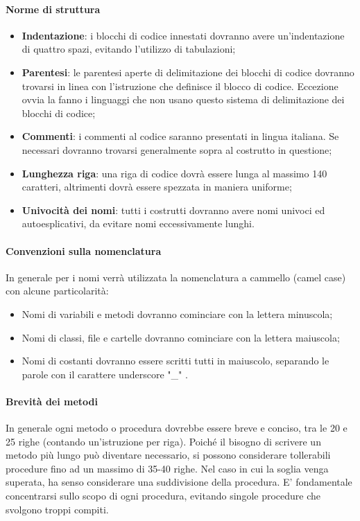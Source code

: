 \paragraph{Norme di struttura}
\begin{itemize}
\item \textbf{Indentazione}: i blocchi di codice innestati dovranno avere un’indentazione di quattro spazi, evitando l'utilizzo di tabulazioni;
\item \textbf{Parentesi}: le parentesi aperte di delimitazione dei blocchi di codice dovranno trovarsi in linea con l'istruzione che definisce il blocco di codice. Eccezione ovvia la fanno i linguaggi che non usano questo sistema di delimitazione dei blocchi di codice;
\item \textbf{Commenti}: i commenti al codice saranno presentati in lingua italiana. Se necessari dovranno trovarsi generalmente sopra al costrutto in questione;
\item \textbf{Lunghezza riga}: una riga di codice dovrà essere lunga al massimo 140 caratteri, altrimenti dovrà essere spezzata in maniera uniforme;
\item  \textbf{Univocità dei nomi}: tutti i costrutti dovranno avere nomi univoci ed autoesplicativi, da evitare nomi eccessivamente lunghi.
\end{itemize}

\paragraph{Convenzioni sulla nomenclatura}
In generale per i nomi verrà utilizzata la nomenclatura a cammello (camel case) con alcune particolarità:
\begin{itemize}
\item Nomi di variabili e metodi dovranno cominciare con la lettera minuscola;
\item Nomi di classi, file e cartelle dovranno cominciare con la lettera maiuscola;
\item Nomi di costanti dovranno essere scritti tutti in maiuscolo, separando le parole con il carattere underscore "\_" .
\end{itemize}

\paragraph{Brevità dei metodi}
In generale ogni metodo o procedura dovrebbe essere breve e conciso, tra le 20 e 25 righe (contando un'istruzione per riga). Poiché il bisogno di scrivere un metodo più lungo può diventare necessario, si possono considerare tollerabili procedure fino ad un massimo di 35-40 righe. Nel caso in cui la soglia venga superata, ha senso considerare una suddivisione della procedura. E' fondamentale concentrarsi sullo scopo di ogni procedura, evitando singole procedure che svolgono troppi compiti.


